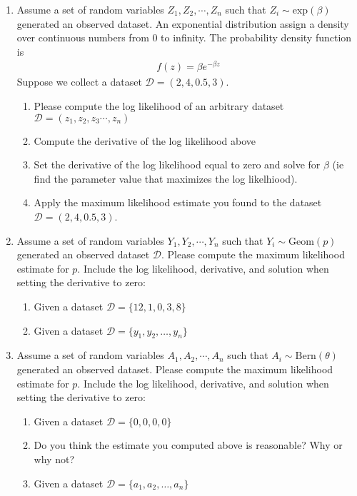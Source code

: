 \begin{enumerate}
    
    \item  Assume a set of random variables $Z_{1}, Z_{2}, \cdots, Z_{n}$ such that $Z_{i} \sim \text{exp}(\beta)$ generated an observed dataset. An exponential distribution assign a density over continuous numbers from 0 to infinity. The probability density function is 
    \begin{align*}
        f(z) = \beta e^{-\beta z}     
    \end{align*}
    Suppose we collect a dataset $\mathcal{D} = (2,4,0.5,3)$.
    \begin{enumerate}
        \item Please compute the log likelihood of an arbitrary dataset $\mathcal{D} = (z_{1},z_{2},z_{3}\cdots,z_{n})$
        \item Compute the derivative of the log likelihood above
        \item Set the derivative of the log likelihood equal to zero and solve for $\beta$ (ie find the parameter value that maximizes the log likelhiood). 
        \item Apply the maximum likelihood estimate you found to the dataset  $\mathcal{D} = (2,4,0.5,3)$.
    \end{enumerate}
    
    \item  Assume a set of random variables $Y_{1}, Y_{2}, \cdots, Y_{n}$ such that $Y_{i} \sim \text{Geom}(p)$ generated an observed dataset $\mathcal{D}$. Please compute the maximum likelihood estimate for $p$. Include the log likelihood, derivative, and solution when setting the derivative to zero: 
    \begin{enumerate}
        \item Given a dataset $\mathcal{D} = \{ 12, 1, 0, 3, 8  \}$
        \item Given a dataset $\mathcal{D} = \{y_{1}, y_{2}, \dots, y_{n}\}$
    \end{enumerate}
    
    \item Assume a set of random variables $A_{1}, A_{2}, \cdots, A_{n}$ such that $A_{i} \sim \text{Bern}(\theta)$ generated an observed dataset. Please compute the maximum likelihood estimate for $p$. Include the log likelihood, derivative, and solution when setting the derivative to zero: 
    \begin{enumerate}
        \item Given a dataset $\mathcal{D} = \{ 0,0,0,0 \}$
        \item Do you think the estimate you computed above is reasonable? Why or why not?
        \item Given a dataset $\mathcal{D} = \{a_{1}, a_{2}, \dots, a_{n}\}$
    \end{enumerate}
    

\end{enumerate}
